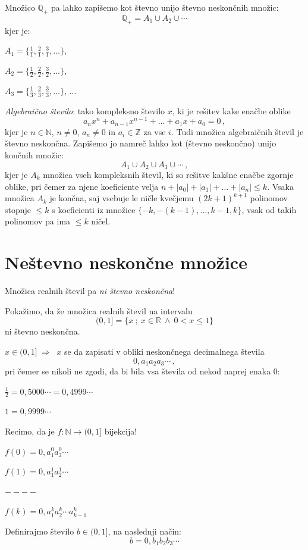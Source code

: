 \documentclass[11pt,paper=b5,DIV=13,headinclude,footinclude]{scrbook}
\def\inn {{~\wedge~}}
\def\sledi {{~\Rightarrow~}}
\begin{document}
Množico $\mathbb{Q}_+$ pa lahko zapišemo kot števno unijo števno neskončnih množic:
$$\mathbb{Q}_+ = A_1\cup A_2\cup \cdots$$
kjer je:

$A_1 = \{\frac{1}{1}, \frac{2}{1}, \frac{3}{1}, \ldots\}$,

$A_2 = \{\frac{1}{2}, \frac{2}{2}, \frac{3}{2}, \ldots\}$,

$A_3 = \{\frac{1}{3}, \frac{2}{3}, \frac{3}{3}, \ldots\}$, $\ldots$


{\em Algebraično število}: tako kompleksno število $x$, ki je rešitev kake enačbe oblike
$$a_nx^n+a_{n-1}x^{n-1}+\ldots+a_1x+a_0 = 0\,,$$
kjer je $n\in \mathbb{N}$, $n\neq 0$, $a_n\neq 0$ in $a_i\in \mathbb{Z}$ za vse $i$.
Tudi množica algebraičnih števil je števno neskončna. Zapišemo jo namreč lahko kot
(števno neskončno) unijo končnih množic:
$$A_1\cup A_2\cup A_3\cup \cdots\,,$$
kjer je $A_k$ množica vseh kompleksnih števil, ki so rešitve
kakšne enačbe zgornje oblike, pri čemer za njene koeficiente velja
$n+|a_0|+|a_1|+\ldots+|a_n|\le k$.
Vsaka množica $A_k$ je končna, saj vsebuje le ničle kvečjemu
$(2k+1)^{k+1}$ polinomov stopnje $\le k$ s koeficienti iz množice $\{-k,-(k-1), \ldots, k-1,k\}$, vsak od takih polinomov pa ima
$\le k$ ničel.


\section{Neštevno neskončne množice}

Množica realnih števil pa {\em ni števno neskončna}!

Pokažimo, da že množica realnih števil na intervalu $$(0,1] = \{x~;~x\in \mathbb{R}\inn 0<x\le 1\}$$
ni števno neskončna.

$x\in (0,1]\sledi$ $x$ se da zapisati v obliki neskončnega decimalnega števila
$$0,a_1a_2a_3\cdots\,,$$
pri čemer se nikoli ne zgodi, da bi bila vsa števila od nekod naprej enaka 0:

$\frac{1}{2} = 0,5000\cdots = 0,4999\cdots$

$1 = 0,9999\cdots$

Recimo, da je $f:\mathbb{N}\to (0,1]$ bijekcija!

$f(0) = 0,a_1^0a_2^0\cdots$

$f(1) = 0,a_1^1a_2^1\cdots$

$----$

$f(k) = 0,a_1^ka_2^k\cdots a^k_{k-1}$

Definirajmo število $b\in (0,1]$, na naslednji način:
$$b = 0,b_1b_2b_3\cdots$$
\end{document}
